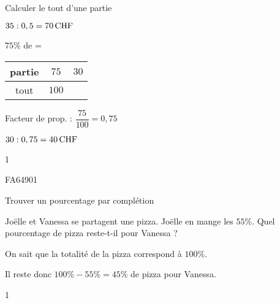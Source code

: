 \documentclass[a4paper,11pt]{report}
\begin{document}
\begin{resolu}{Calculer le tout d'une partie}
{\begin{tasks}
\begin{minipage}[]{0.7\textwidth}
            $35 : 0,5=\tunit{70}{CHF}$
         \end{minipage}
     
    \task $75\%$ de  = 
    
        \begin{minipage}[]{0.3\textwidth}
         \begin{tabular}{|c|c|c|}
             \hline
             partie & $75$ & $30$ \\ \hline
             tout & $100$ &  \\ \hline
         \end{tabular}
         \end{minipage}
         \begin{minipage}[]{0.7\textwidth}
         Facteur de prop. : $\dfrac{75}{100}=0,75$
         
            $30 : 0,75=\tunit{40}{CHF}$
         \end{minipage}
     
\end{tasks}
}{1}    
\end{resolu}




\begin{exof}{FA64}{90}{1} %
\end{exof}

\begin{resolu}{Trouver un pourcentage par complétion}{
    Joëlle et Vanessa se partagent une pizza. Joëlle en mange les $55\%$. Quel pourcentage de pizza reste-t-il pour Vanessa ?
    \begin{multicols}{2}
    
    On sait que la totalité de la pizza correspond à $100\%$.
    
    Il reste donc $100\%-55\%=45\%$ de pizza pour Vanessa.
    \end{multicols}
}{1}
\end{resolu}
\end{document}
